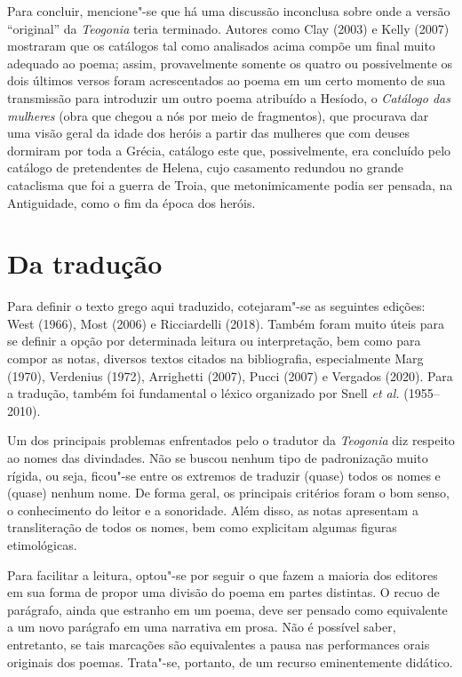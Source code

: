 Para concluir, mencione"-se que há uma discussão inconclusa sobre onde a
versão ``original'' da \emph{Teogonia} teria terminado. Autores como
Clay (2003) e Kelly (2007) mostraram que os catálogos tal como
analisados acima compõe um final muito adequado ao poema; assim,
provavelmente somente os quatro ou possivelmente os dois últimos versos
foram acrescentados ao poema em um certo momento de sua transmissão para
introduzir um outro poema atribuído a Hesíodo, o \emph{Catálogo das
mulheres} (obra que chegou a nós por meio de fragmentos), que procurava
dar uma visão geral da idade dos heróis a partir das mulheres que com
deuses dormiram por toda a Grécia, catálogo este que, possivelmente, era
concluído pelo catálogo de pretendentes de Helena, cujo casamento
redundou no grande cataclisma que foi a guerra de Troia, que
metonimicamente podia ser pensada, na Antiguidade, como o fim da época
dos heróis.

\section{Da tradução}

Para definir o texto grego aqui traduzido, cotejaram"-se as seguintes
edições: West (1966), Most (2006) e Ricciardelli (2018). Também foram
muito úteis para se definir a opção por determinada leitura ou
interpretação, bem como para compor as notas, diversos textos citados na
bibliografia, especialmente Marg (1970), Verdenius (1972), Arrighetti
(2007), Pucci (2007) e Vergados (2020). Para a tradução, também foi
fundamental o léxico organizado por Snell \emph{et al.} (1955--2010).

Um dos principais problemas enfrentados pelo o tradutor da
\emph{Teogonia} diz respeito ao nomes das divindades. Não se buscou
nenhum tipo de padronização muito rígida, ou seja, ficou"-se entre os
extremos de traduzir (quase) todos os nomes e (quase) nenhum nome. De
forma geral, os principais critérios foram o bom senso, o conhecimento
do leitor e a sonoridade. Além disso, as notas apresentam a
transliteração de todos os nomes, bem como explicitam algumas figuras
etimológicas.

Para facilitar a leitura, optou"-se por seguir o que fazem a maioria dos
editores em sua forma de propor uma divisão do poema em partes
distintas. O recuo de parágrafo, ainda que estranho em um poema, deve
ser pensado como equivalente a um novo parágrafo em uma narrativa em
prosa. Não é possível saber, entretanto, se tais marcações são
equivalentes a pausa nas performances orais originais dos poemas.
Trata"-se, portanto, de um recurso eminentemente didático.

